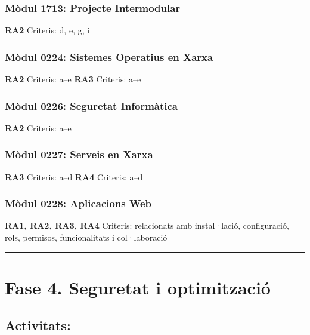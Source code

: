 \documentclass[
  a4paper,
]{article}
\begin{document}
\subsubsection{Mòdul 1713: Projecte
Intermodular}\label{muxf2dul-1713-projecte-intermodular-2}

\textbf{RA2} Criteris: d, e, g, i

\subsubsection{Mòdul 0224: Sistemes Operatius en
Xarxa}\label{muxf2dul-0224-sistemes-operatius-en-xarxa-2}

\textbf{RA2} Criteris: a--e \textbf{RA3} Criteris: a--e

\subsubsection{Mòdul 0226: Seguretat
Informàtica}\label{muxf2dul-0226-seguretat-informuxe0tica-2}

\textbf{RA2} Criteris: a--e

\subsubsection{Mòdul 0227: Serveis en
Xarxa}\label{muxf2dul-0227-serveis-en-xarxa-2}

\textbf{RA3} Criteris: a--d \textbf{RA4} Criteris: a--d

\subsubsection{Mòdul 0228: Aplicacions
Web}\label{muxf2dul-0228-aplicacions-web-2}

\textbf{RA1, RA2, RA3, RA4} Criteris: relacionats amb instal·lació,
configuració, rols, permisos, funcionalitats i col·laboració

\begin{center}\rule{0.5\linewidth}{0.5pt}\end{center}

\section{Fase 4. Seguretat i
optimització}\label{fase-4.-seguretat-i-optimitzaciuxf3}

\subsection{Activitats:}\label{activitats-3}
\end{document}
